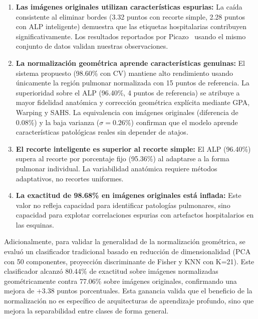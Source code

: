 \begin{enumerate}
    \item \textbf{Las imágenes originales utilizan características espurias:} La caída consistente al eliminar bordes (3.32 puntos con recorte simple, 2.28 puntos con ALP inteligente) demuestra que las etiquetas hospitalarias contribuyen significativamente. Los resultados reportados por Picazo~\cite{picazo2023tesis} usando el mismo conjunto de datos validan nuestras observaciones.

    \item \textbf{La normalización geométrica aprende características genuinas:} El sistema propuesto (98.60\% con CV) mantiene alto rendimiento usando únicamente la región pulmonar normalizada con 15 puntos de referencia. La superioridad sobre el ALP (96.40\%, 4 puntos de referencia) se atribuye a mayor fidelidad anatómica y corrección geométrica explícita mediante GPA, Warping y SAHS. La equivalencia con imágenes originales (diferencia de 0.08\%) y la baja varianza ($\sigma = 0.26\%$) confirman que el modelo aprende características patológicas reales sin depender de atajos.

    \item \textbf{El recorte inteligente es superior al recorte simple:} El ALP (96.40\%) supera al recorte por porcentaje fijo (95.36\%) al adaptarse a la forma pulmonar individual. La variabilidad anatómica requiere métodos adaptativos, no recortes uniformes.

    \item \textbf{La exactitud de 98.68\% en imágenes originales está inflada:} Este valor no refleja capacidad para identificar patologías pulmonares, sino capacidad para explotar correlaciones espurias con artefactos hospitalarios en las esquinas.
\end{enumerate}

Adicionalmente, para validar la generalidad de la normalización geométrica, se evaluó un clasificador tradicional basado en reducción de dimensionalidad (PCA con 50 componentes, proyección discriminante de Fisher y KNN con K=21). Este clasificador alcanzó 80.44\% de exactitud sobre imágenes normalizadas geométricamente contra 77.06\% sobre imágenes originales, confirmando una mejora de +3.38 puntos porcentuales. Esta ganancia valida que el beneficio de la normalización no es específico de arquitecturas de aprendizaje profundo, sino que mejora la separabilidad entre clases de forma general.
